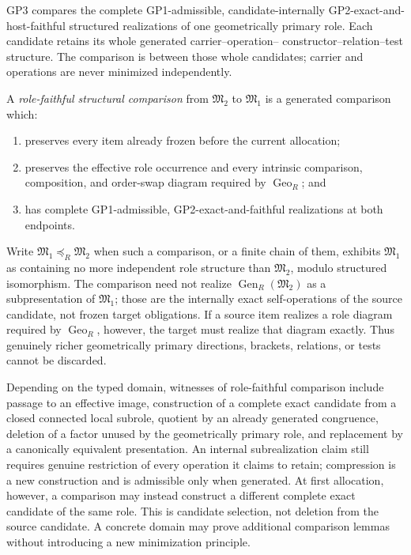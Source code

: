 \documentclass[12pt,a4paper]{article}
\begin{document}
\begin{mdframed}[style=postulatebox,nobreak=false]
\begin{postulate}
\label{p2:post:GP3}
GP3 compares the complete GP1-admissible, candidate-internally
GP2-exact-and-host-faithful structured realizations of one geometrically
primary role.  Each candidate retains its whole generated carrier--operation--
constructor--relation--test structure.  The comparison is between those whole
candidates; carrier and operations are never minimized independently.

A \emph{role-faithful structural comparison} from \(\mathfrak M_2\) to
\(\mathfrak M_1\) is a generated comparison which:
\begin{enumerate}[label=(\alph*),leftmargin=2em]
\item preserves every item already frozen before the current allocation;
\item preserves the effective role occurrence and every intrinsic comparison,
composition, and order-swap diagram required by
\(\operatorname{Geo}_R\); and
\item has complete GP1-admissible, GP2-exact-and-faithful realizations at both
endpoints.
\end{enumerate}
Write \(\mathfrak M_1\preceq_R\mathfrak M_2\) when such a comparison, or a
finite chain of them, exhibits \(\mathfrak M_1\) as containing no more
independent role structure than \(\mathfrak M_2\), modulo structured
isomorphism.  The comparison need not realize
\(\operatorname{Gen}_R(\mathfrak M_2)\) as a subpresentation of
\(\mathfrak M_1\); those are the internally exact self-operations of the
source candidate, not frozen target obligations.  If a source item realizes a
role diagram required by \(\operatorname{Geo}_R\), however, the target must
realize that diagram exactly.  Thus genuinely richer geometrically primary
directions, brackets, relations, or tests cannot be discarded.

Depending on the typed domain, witnesses of role-faithful comparison include
passage to an effective image, construction of a complete exact candidate from
a closed connected local subrole, quotient by an already generated
congruence, deletion of a factor unused by the geometrically primary role, and
replacement by a canonically equivalent presentation.  An internal
subrealization claim still requires genuine restriction of every operation it
claims to retain; compression is a new construction and is admissible only
when generated.  At first allocation, however, a comparison may instead
construct a different complete exact candidate of the same role.  This is
candidate selection, not deletion from the source candidate.  A concrete
domain may prove additional comparison lemmas without introducing a new
minimization principle.


\end{postulate}
\end{mdframed}
\end{document}
